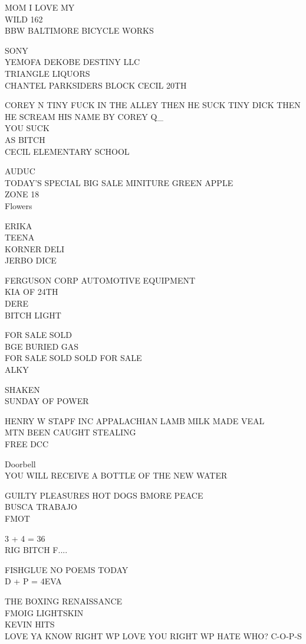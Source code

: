 \documentclass[10pt,letterpaper]{article}
\begin{document}
MOM I LOVE MY\\
WILD 162\\
BBW BALTIMORE BICYCLE WORKS

SONY\\
YEMOFA DEKOBE DESTINY LLC\\
TRIANGLE LIQUORS\\
CHANTEL PARKSIDERS BLOCK CECIL 20TH

COREY N TINY FUCK IN THE ALLEY THEN HE SUCK TINY DICK THEN HE SCREAM HIS NAME BY COREY Q\_\\
YOU SUCK\\
AS BITCH\\
CECIL ELEMENTARY SCHOOL

AUDUC\\
TODAY'S SPECIAL BIG SALE MINITURE GREEN APPLE\\
ZONE 18\\
Flowers

ERIKA\\
TEENA\\
KORNER DELI\\
JERBO DICE

FERGUSON CORP AUTOMOTIVE EQUIPMENT\\
KIA OF 24TH\\
DERE\\
BITCH LIGHT

FOR SALE SOLD\\
BGE BURIED GAS\\
FOR SALE SOLD SOLD FOR SALE\\
ALKY

SHAKEN\\
SUNDAY OF POWER

HENRY W STAPF INC APPALACHIAN LAMB MILK MADE VEAL\\
MTN BEEN CAUGHT STEALING\\
FREE DCC

Doorbell\\
YOU WILL RECEIVE A BOTTLE OF THE NEW WATER

GUILTY PLEASURES HOT DOGS BMORE PEACE\\
BUSCA TRABAJO\\
FMOT

3 + 4 = 36\\
RIG BITCH F....

FISHGLUE NO POEMS TODAY\\
D + P = 4EVA

THE BOXING RENAISSANCE\\
FMOIG LIGHTSKIN\\
KEVIN HITS\\
LOVE YA KNOW RIGHT WP LOVE YOU RIGHT WP HATE WHO? C{-}O{-}P{-}S
\end{document}
